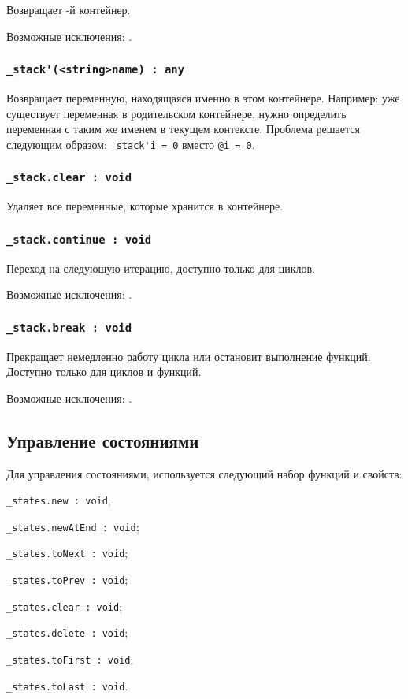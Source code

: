 Возвращает -й  контейнер.

Возможные исключения: .

\subsubsection{\lstinline|_stack'(<string>name) : any|}

Возвращает переменную, находящаяся именно в этом контейнере. Например: уже существует переменная  в родительском контейнере, нужно определить переменная с таким же именем в текущем контексте. Проблема решается следующим образом: \lstinline|_stack'i = 0| вместо \lstinline|@i = 0|.

\subsubsection{\lstinline|_stack.clear : void|}

Удаляет все переменные, которые хранится в контейнере.

\subsubsection{\lstinline|_stack.continue : void|}

Переход на следующую итерацию, доступно только для циклов.

Возможные исключения: .

\subsubsection{\lstinline|_stack.break : void|}

Прекращает немедленно работу цикла или остановит выполнение функций. Доступно только для циклов и функций.

Возможные исключения: .

\subsection{Управление состояниями}

Для управления состояниями, используется следующий набор функций и свойств:
\begin{icItems}
	\item \lstinline|_states.new : void|;
	\item \lstinline|_states.newAtEnd : void|;
	\item \lstinline|_states.toNext : void|;
	\item \lstinline|_states.toPrev : void|;
	\item \lstinline|_states.clear : void|;
	\item \lstinline|_states.delete : void|;
	\item \lstinline|_states.toFirst : void|;
	\item \lstinline|_states.toLast : void|.
\end{icItems}

